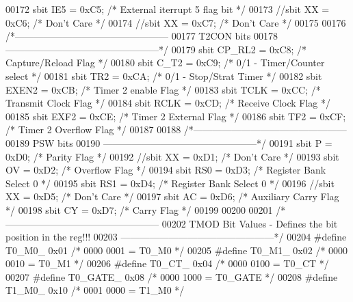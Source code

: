 \begin{DoxyCode}
00172 sbit IE5  = 0xC5; \textcolor{comment}{/* External iterrupt 5 flag bit */}
00173 \textcolor{comment}{//sbit XX   = 0xC6; /* Don't Care */}
00174 \textcolor{comment}{//sbit XX   = 0xC7; /* Don't Care */}
00175 
00176 \textcolor{comment}{/*------------------------------------------------}
00177 \textcolor{comment}{T2CON bits}
00178 \textcolor{comment}{------------------------------------------------*/}
00179 sbit CP_RL2 = 0xC8; \textcolor{comment}{/* Capture/Reload Flag */}
00180 sbit C_T2   = 0xC9; \textcolor{comment}{/* 0/1 - Timer/Counter select */}
00181 sbit TR2    = 0xCA; \textcolor{comment}{/* 0/1 - Stop/Strat Timer */}
00182 sbit EXEN2  = 0xCB; \textcolor{comment}{/* Timer 2 enable Flag */}
00183 sbit TCLK   = 0xCC; \textcolor{comment}{/* Transmit Clock Flag */}
00184 sbit RCLK   = 0xCD; \textcolor{comment}{/* Receive Clock Flag */}
00185 sbit EXF2   = 0xCE; \textcolor{comment}{/* Timer 2 External Flag */}
00186 sbit TF2    = 0xCF; \textcolor{comment}{/* Timer 2 Overflow Flag */} 
00187 
00188 \textcolor{comment}{/*------------------------------------------------}
00189 \textcolor{comment}{PSW bits}
00190 \textcolor{comment}{------------------------------------------------*/}
00191 sbit P    = 0xD0; \textcolor{comment}{/* Parity Flag */}
00192 \textcolor{comment}{//sbit XX     = 0xD1; /* Don't Care */}
00193 sbit OV   = 0xD2; \textcolor{comment}{/* Overflow Flag */}
00194 sbit RS0  = 0xD3; \textcolor{comment}{/* Register Bank Select 0 */}
00195 sbit RS1  = 0xD4; \textcolor{comment}{/* Register Bank Select 0 */}
00196 \textcolor{comment}{//sbit XX   = 0xD5; /* Don't Care */}
00197 sbit AC   = 0xD6; \textcolor{comment}{/* Auxiliary Carry Flag */}
00198 sbit CY   = 0xD7; \textcolor{comment}{/* Carry Flag */}
00199 
00200 
00201 \textcolor{comment}{/*------------------------------------------------}
00202 \textcolor{comment}{TMOD Bit Values - Defines the bit position in the reg!!!}
00203 \textcolor{comment}{------------------------------------------------*/}
00204 \textcolor{preprocessor}{#define T0\_M0\_   0x01 }\textcolor{comment}{/* 0000 0001 = T0\_M0 */}\textcolor{preprocessor}{}
00205 \textcolor{preprocessor}{#define T0\_M1\_   0x02 }\textcolor{comment}{/* 0000 0010 = T0\_M1 */}\textcolor{preprocessor}{}
00206 \textcolor{preprocessor}{#define T0\_CT\_   0x04 }\textcolor{comment}{/* 0000 0100 = T0\_CT */}\textcolor{preprocessor}{}
00207 \textcolor{preprocessor}{#define T0\_GATE\_ 0x08 }\textcolor{comment}{/* 0000 1000 = T0\_GATE */}\textcolor{preprocessor}{}
00208 \textcolor{preprocessor}{#define T1\_M0\_   0x10 }\textcolor{comment}{/* 0001 0000 = T1\_M0 */}\textcolor{preprocessor}{}

\end{DoxyCode}
